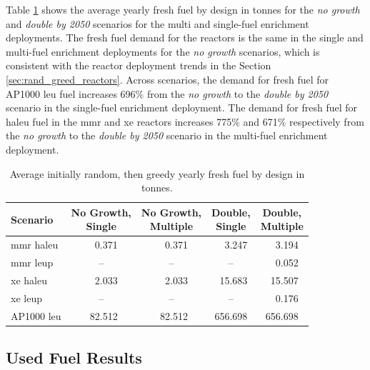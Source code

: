 Table \ref{tab:rand_greed_fresh_avg} shows the average yearly fresh fuel by design in tonnes for the \textit{no growth} and \textit{double by 2050} scenarios for the multi and single-fuel enrichment deployments. The fresh fuel demand for the reactors is the same in the single and multi-fuel enrichment deployments for the \textit{no growth} scenarios, which is consistent with the reactor deployment trends in the Section \ref{sec:rand_greed_reactors}. Across scenarios, the demand for fresh fuel for AP1000 \gls{leu} fuel increases 696\% from the \textit{no growth} to the \textit{double by 2050} scenario in the single-fuel enrichment deployment. The demand for fresh fuel for \gls{haleu} fuel in the \gls{mmr} and \gls{xe} reactors increases 775\% and 671\% respectively from the \textit{no growth} to the \textit{double by 2050} scenario in the multi-fuel enrichment deployment.

\begin{table}[H]
    \centering
    \caption{Average initially random, then greedy yearly fresh fuel by design in tonnes.}
    \label{tab:rand_greed_fresh_avg}
    \begin{tabular}{l c c c c}
       \toprule
       Scenario & \shortstack{No Growth,\\ Single} & \shortstack{No Growth,\\ Multiple} & \shortstack{Double,\\ Single} & \shortstack{Double,\\ Multiple}  \\
       \midrule
       \gls{mmr} \gls{haleu}   & \textcolor{white}{00}0.371    & \textcolor{white}{00}0.371   & \textcolor{white}{00}3.247    & \textcolor{white}{00}3.194    \\
       \gls{mmr} \gls{leup}    & --       & --      & --       & \textcolor{white}{00}0.052    \\
       \gls{xe} \gls{haleu}    & \textcolor{white}{00}2.033    & \textcolor{white}{00}2.033   & \textcolor{white}{0}15.683   & \textcolor{white}{0}15.507   \\
       \gls{xe} \gls{leup}     & --       & --      & --       & \textcolor{white}{00}0.176    \\
       AP1000 \gls{leu}        & \textcolor{white}{0}82.512   & \textcolor{white}{0}82.512  & 656.698  & 656.698  \\
       \bottomrule
    \end{tabular}
\end{table}


\subsection{Used Fuel Results}
\label{sec:rand_greed_used}


